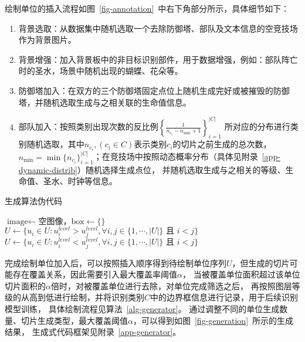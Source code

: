 绘制单位的插入流程如图~\ref{fig-annotation}~中右下角部分所示，具体细节如下：
\begin{enumerate}
  \item 背景选取：从数据集中随机选取一个去除防御塔、部队及文本信息的空竞技场作为背景图片。
  \item 背景增强：加入背景板中的非目标识别部件，用于数据增强，例如：部队阵亡时的圣水，场景中随机出现的蝴蝶、花朵等。
  \item 防御塔加入：在双方的三个防御塔固定点位上随机生成完好或被摧毁的防御塔，并随机选取生成与之相关联的生命值信息。
  \item 部队加入：按照类别出现次数的反比例$\left\{\frac{1}{n_{c_i}-n_{\min}+1}\right\}_{i=1}^{|C|}$\vspace{0.5ex}
  所对应的分布进行类别随机选取，其中$n_{c_i},(c_i\in C)$表示类别$c_i$的切片之前生成的总次数，
  $n_{\min}=\min\{n_{c_i}\}_{i=1}^{|C|}$；在竞技场中按照动态概率分布（具体见附录~\ref{app-dynamic-distrib}）随机选择生成点位，
  并随机选取生成与之相关的等级、生命值、圣水、时钟等信息。
\end{enumerate}

\begin{algorithm}[ht]
	\caption{生成算法伪代码\label{alg-generator}}
	\IncMargin{2em}
	\DontPrintSemicolon
  $\text{image}\gets$空图像，$\text{box}\gets \{\}$
  $U\gets \{u_i\in U: u_i^{level}>u_j^{level}, \forall i, j \in \{1,\cdots,|U|\} \text{~且~} i < j\}$\;
  $U\gets \{u_i\in U: u_i^{level}<u_j^{level}, \forall i, j \in \{1,\cdots,|U|\} \text{~且~} i < j\}$\;
\end{algorithm}
\newpage
完成绘制单位加入后，可以按照插入顺序得到待绘制单位序列$U$，但生成的切片可能存在覆盖关系，因此需要引入最大覆盖率阈值$\alpha$，
当被覆盖单位面积超过该单位切片面积的$\alpha$倍时，对被覆盖单位进行去除，对单位完成筛选之后，
再按照图层等级的从高到低进行绘制，并将识别类别$C$中的边界框信息进行记录，用于后续识别模型训练，
具体绘制流程见算法~\ref{alg-generator}。%
通过调整不同的单位生成数量、切片生成类型，最大覆盖阈值$\alpha$，可以得到如图~\ref{fig-generation}~所示的生成结果，
生成式代码框架见附录~\ref{app-generator}。

